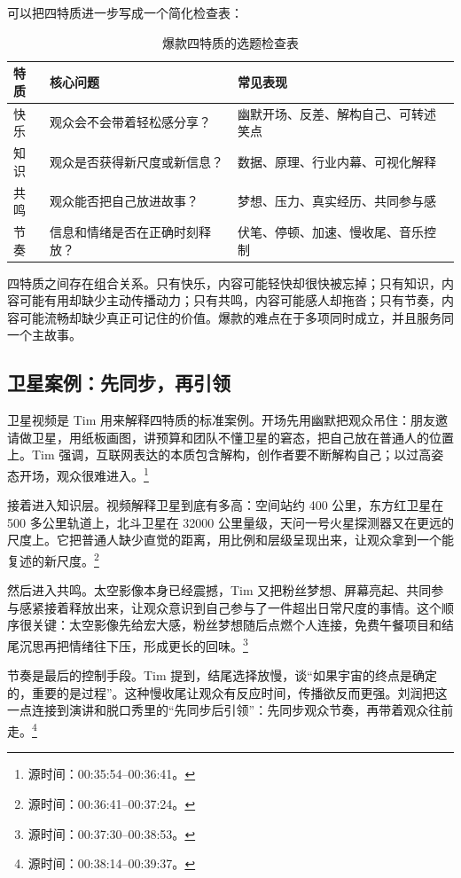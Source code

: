 \documentclass[a4paper]{article}
\begin{document}
可以把四特质进一步写成一个简化检查表：

\begin{table}[htbp]
  \centering
  \caption{爆款四特质的选题检查表}
  \label{tab:section02-four-traits-checklist}
  \begin{tabular}{lll}
    \toprule
    特质 & 核心问题 & 常见表现 \\
    \midrule
    快乐 & 观众会不会带着轻松感分享？ & 幽默开场、反差、解构自己、可转述笑点 \\
    知识 & 观众是否获得新尺度或新信息？ & 数据、原理、行业内幕、可视化解释 \\
    共鸣 & 观众能否把自己放进故事？ & 梦想、压力、真实经历、共同参与感 \\
    节奏 & 信息和情绪是否在正确时刻释放？ & 伏笔、停顿、加速、慢收尾、音乐控制 \\
    \bottomrule
  \end{tabular}
\end{table}

四特质之间存在组合关系。只有快乐，内容可能轻快却很快被忘掉；只有知识，内容可能有用却缺少主动传播动力；只有共鸣，内容可能感人却拖沓；只有节奏，内容可能流畅却缺少真正可记住的价值。爆款的难点在于多项同时成立，并且服务同一个主故事。

\subsection{卫星案例：先同步，再引领}

卫星视频是 Tim 用来解释四特质的标准案例。开场先用幽默把观众吊住：朋友邀请做卫星，用纸板画图，讲预算和团队不懂卫星的窘态，把自己放在普通人的位置上。Tim 强调，互联网表达的本质包含解构，创作者要不断解构自己；以过高姿态开场，观众很难进入。\footnote{源时间：00:35:54--00:36:41。}

接着进入知识层。视频解释卫星到底有多高：空间站约 400 公里，东方红卫星在 500 多公里轨道上，北斗卫星在 32000 公里量级，天问一号火星探测器又在更远的尺度上。它把普通人缺少直觉的距离，用比例和层级呈现出来，让观众拿到一个能复述的新尺度。\footnote{源时间：00:36:41--00:37:24。}

然后进入共鸣。太空影像本身已经震撼，Tim 又把粉丝梦想、屏幕亮起、共同参与感紧接着释放出来，让观众意识到自己参与了一件超出日常尺度的事情。这个顺序很关键：太空影像先给宏大感，粉丝梦想随后点燃个人连接，免费午餐项目和结尾沉思再把情绪往下压，形成更长的回味。\footnote{源时间：00:37:30--00:38:53。}

节奏是最后的控制手段。Tim 提到，结尾选择放慢，谈“如果宇宙的终点是确定的，重要的是过程”。这种慢收尾让观众有反应时间，传播欲反而更强。刘润把这一点连接到演讲和脱口秀里的“先同步后引领”：先同步观众节奏，再带着观众往前走。\footnote{源时间：00:38:14--00:39:37。}
\end{document}
